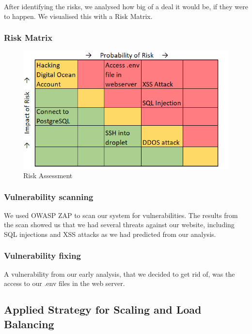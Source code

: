 After identifying the risks, we analysed how big of a deal it would be, if they were to happen. We visualised this with a Risk Matrix.

\subsubsection*{Risk Matrix}

\begin{figure}[H]
\begin{center}
    \includegraphics[scale=0.9]{figures/risk assessment.png}
    \caption{Risk Assessment}
  \label{riskmatrix}
\end{center}
\end{figure}

\subsubsection*{Vulnerability scanning}
We used OWASP ZAP to scan our system for vulnerabilities. The results from the scan showed us that we had several threats against our website, including SQL injections and XSS attacks as we had predicted from our analysis.

\subsubsection*{Vulnerability fixing}
A vulnerability from our early analysis, that we decided to get rid of, was the access to our .env files in the web server. 


\subsection{Applied Strategy for Scaling and Load Balancing}

